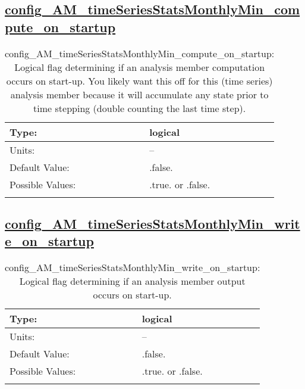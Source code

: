 \subsection[config\_AM\_timeSeriesStatsMonthlyMin\_compute\_on\_startup]{\hyperref[sec:nm_tab_AM_timeSeriesStatsMonthlyMin]{config\_AM\_timeSeriesStatsMonthlyMin\_compute\_on\_startup}}
\label{subsec:nm_sec_config_AM_timeSeriesStatsMonthlyMin_compute_on_startup}
\begin{center}
\begin{longtable}{| p{2.0in} || p{4.0in} |}
    \hline
    Type: & logical \\
    \hline
    Units: & -- \\
    \hline
    Default Value: & .false. \\
    \hline
    Possible Values: & .true. or .false. \\
    \hline
    \caption{config\_AM\_timeSeriesStatsMonthlyMin\_compute\_on\_startup: Logical flag determining if an analysis member computation occurs on start-up. You likely want this off for this (time series) analysis member because it will accumulate any state prior to time stepping (double counting the last time step).}
\end{longtable}
\end{center}
\subsection[config\_AM\_timeSeriesStatsMonthlyMin\_write\_on\_startup]{\hyperref[sec:nm_tab_AM_timeSeriesStatsMonthlyMin]{config\_AM\_timeSeriesStatsMonthlyMin\_write\_on\_startup}}
\label{subsec:nm_sec_config_AM_timeSeriesStatsMonthlyMin_write_on_startup}
\begin{center}
\begin{longtable}{| p{2.0in} || p{4.0in} |}
    \hline
    Type: & logical \\
    \hline
    Units: & -- \\
    \hline
    Default Value: & .false. \\
    \hline
    Possible Values: & .true. or .false. \\
    \hline
    \caption{config\_AM\_timeSeriesStatsMonthlyMin\_write\_on\_startup: Logical flag determining if an analysis member output occurs on start-up.}
\end{longtable}
\end{center}
